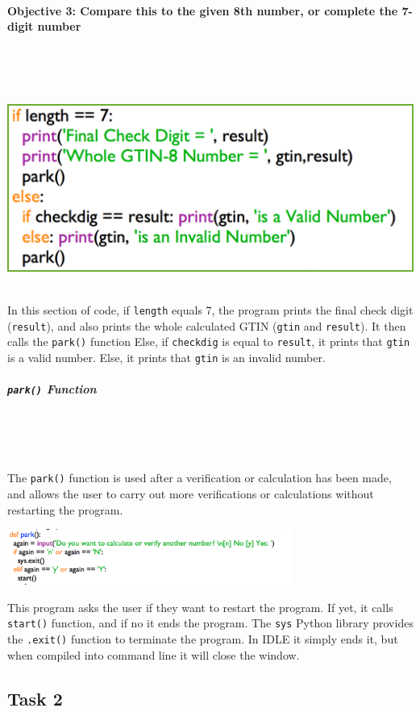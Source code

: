 \documentclass[a4paper]{article}
\begin{document}
\paragraph{Objective 3: Compare this to the given 8th number, or complete the 7-digit number} ~\par ~\par
\noindent\includegraphics{task1_compare1.png} ~\par
In this section of code, if \verb?length? equals 7, the program prints the final check digit (\verb?result?), and also prints the whole calculated GTIN (\verb?gtin? and \verb?result?). It then calls the \verb|park()| function
Else, if \verb?checkdig? is equal to \verb?result?, it prints that \verb?gtin? is a valid number. Else, it prints that \verb?gtin? is an invalid number.
\subparagraph{\texttt{park()} Function} ~ \par ~ \par
The \verb|park()| function is used after a verification or calculation has been made, and allows the user to carry out more verifications or calculations without restarting the program. \par
\noindent\includegraphics[width=0.7\textwidth, left, width=\linewidth, frame]{task1_park().png} \par
This program asks the user if they want to restart the program. If yet, it calls \verb|start()| function, and if no it ends the program. The \verb|sys| Python library provides the \verb|.exit()| function to terminate the program. In IDLE it simply ends it, but when compiled into command line it will close the window.


\newpage
\subsection{Task 2}
\end{document}
